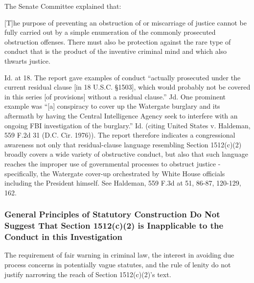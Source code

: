 The Senate Committee explained that:

[T]he purpose of preventing an obstruction of or miscarriage of justice cannot be fully carried out by a simple enumeration of the commonly prosecuted obstruction offenses.
There must also be protection against the rare type of conduct that is the product of the inventive criminal mind and which also thwarts justice.

Id. at 18. The report gave examples of conduct “actually prosecuted under the current residual clause [in 18 U.S.C. \S 1503], which would probably not be covered in this series [of provisions] without a residual clause.” Jd.
One prominent example was “[a] conspiracy to cover up the Watergate burglary and its aftermath by having the Central Intelligence Agency seek to interfere with an ongoing FBI investigation of the burglary.” Id. (citing United States v. Haldeman, 559 F.2d 31 (D.C. Cir. 1976)).
The report therefore indicates a congressional awareness not only that residual-clause language resembling Section 1512(c)(2) broadly covers a wide variety of obstructive conduct, but also that such language reaches the improper use of governmental processes to obstruct justice - specifically, the Watergate cover-up orchestrated by White House officials including the President himself.
See Haldeman, 559 F.3d at 51, 86-87, 120-129, 162.%

\subsubsection{General Principles of Statutory Construction Do Not Suggest That Section 1512(c)(2) is Inapplicable to the Conduct in this Investigation}

The requirement of fair warning in criminal law, the interest in avoiding due process concerns in potentially vague statutes, and the rule of lenity do not justify narrowing the reach of Section 1512(c)(2)’s text.%

